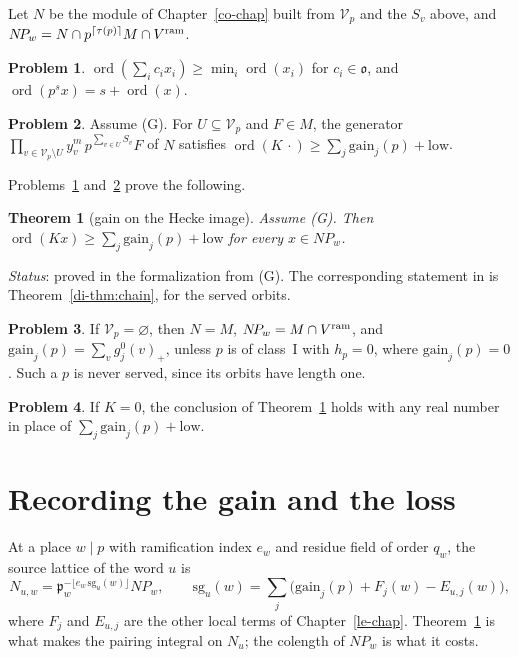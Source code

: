 \documentclass[reqno]{amsart}
\newcounter{chap}
\theoremstyle{definition}
\newtheorem{problem}{Problem}[section]
\theoremstyle{plain}
\newtheorem{theorem}{Theorem}[section]
\theoremstyle{remark}
\newcommand{\Vc}{\mathcal V}
\newcommand{\gain}{\mathrm{gain}}
\newcommand{\ord}{\operatorname{ord}}
\newcommand{\vo}{\mathfrak o}
\begin{document}
Let \(N\) be the module of Chapter~\ref{co-chap} built from \(\Vc_p\) and the \(S_v\) above, and \(N\!P_w=N\cap p^{\lceil\tau(p)\rceil}M\cap V^{\rm ram}\).

\begin{problem}\label{pr:ord-span}
\(\ord(\sum_ic_ix_i)\ge\min_i\ord(x_i)\) for \(c_i\in\vo\), and \(\ord(p^sx)=s+\ord(x)\).
\end{problem}

\begin{problem}\label{pr:generators}
Assume (G).  For \(U\subseteq\Vc_p\) and \(F\in M\), the generator \(\prod_{v\in\Vc_p\setminus U}y_v^m\,p^{\sum_{v\in U}S_v}F\) of \(N\) satisfies \(\ord(K\,\cdot)\ge\sum_j\gain_j(p)+\mathrm{low}\).
\end{problem}

Problems~\ref{pr:ord-span} and~\ref{pr:generators} prove the following.

\begin{theorem}[gain on the Hecke image]\label{thm:gain}
Assume (G).  Then \(\ord(Kx)\ge\sum_j\gain_j(p)+\mathrm{low}\) for every \(x\in N\!P_w\).
\end{theorem}

\noindent\emph{Status}: proved in the formalization from (G).  The corresponding statement in \cite{Adr} is Theorem~\ref{di-thm:chain}, for the served orbits.

\begin{problem}\label{pr:unserved}
If \(\Vc_p=\varnothing\), then \(N=M\), \(N\!P_w=M\cap V^{\rm ram}\), and \(\gain_j(p)=\sum_vg^0_j(v)_+\), unless \(p\) is of class~I with \(h_p=0\), where \(\gain_j(p)=0\).  Such a \(p\) is never served, since its orbits have length one.
\end{problem}

\begin{problem}\label{pr:zero-chain}
If \(K=0\), the conclusion of Theorem~\ref{thm:gain} holds with any real number in place of \(\sum_j\gain_j(p)+\mathrm{low}\).
\end{problem}

\section{Recording the gain and the loss}\label{sec:record}

At a place \(w\mid p\) with ramification index \(e_w\) and residue field of order \(q_w\), the source lattice of the word \(u\) is
\[
 N_{u,w}=\mathfrak p_w^{-\lfloor e_w\,\mathrm{sg}_u(w)\rfloor}N\!P_w,\qquad \mathrm{sg}_u(w)=\sum_j\bigl(\gain_j(p)+F_j(w)-E_{u,j}(w)\bigr),
\]
where \(F_j\) and \(E_{u,j}\) are the other local terms of Chapter~\ref{le-chap}.  Theorem~\ref{thm:gain} is what makes the pairing integral on \(N_u\); the colength of \(N\!P_w\) is what it costs.
\end{document}
